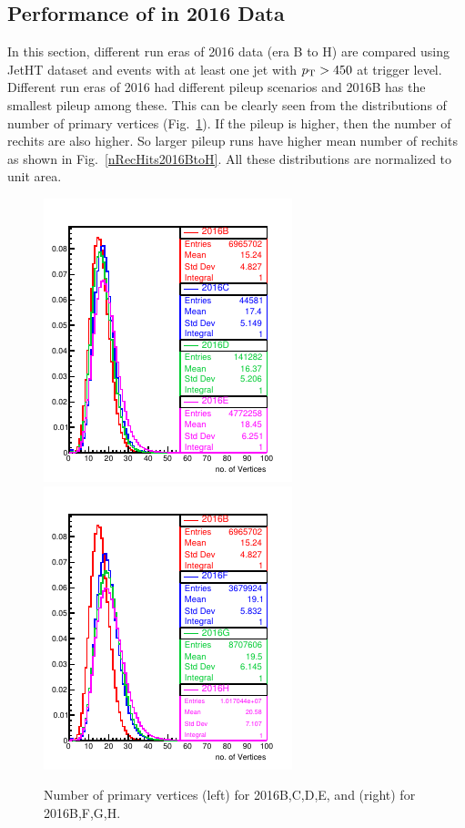 \subsection{Performance of \ratiosl in 2016 Data}
In this section, different run eras of 2016 data (era B to H) are compared using JetHT dataset and events with 
at least one jet with $p_{\mathrm{T}} > 450$ \gev at trigger level.
Different run eras of 2016 had different pileup scenarios and 2016B has the 
smallest pileup among these. This can be clearly seen from the distributions 
of number of primary vertices (Fig.~\ref{nVtx2016BtoH}).
 If the pileup is higher, then the number of rechits 
are also higher. So larger pileup runs have higher mean number of rechits as 
shown in Fig.~\ref{nRecHits2016BtoH}. All these distributions are
normalized to unit area.


\begin{figure}[!h] %
\centering
\includegraphics[width=0.45\linewidth]{../Figures/Chap2/ImageFiles_HF/BasicPics/Comp2016/nVtx2016BtoE.pdf}
\includegraphics[width=0.45\linewidth]{../Figures/Chap2/ImageFiles_HF/BasicPics/Comp2016/nVtx2016BFGH.pdf}
\caption{Number of primary vertices (left) for 2016B,C,D,E, and (right) for 2016B,F,G,H.}
\label{nVtx2016BtoH}
\end{figure}

